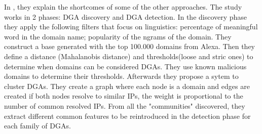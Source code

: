 In \cite{phoenix}, they explain the shortcomes of some of the other approaches. The study works in 2 phases: DGA discovery and DGA detection. In the discovery phase they apply the following filters that focus on linguistics: percentage of meaningful word in the domain name; popularity of the ngrams of the domain. They construct a base generated with the top 100.000 domains from Alexa. Then they define a distance (Mahalanobis distance) and thresholds(loose and stric ones) to determine when domains can be considered DGAs. They use known malicious domains to determine their thresholds. Afterwards they propose a sytem to cluster DGAs. They create a graph where each node is a domain and edges are created if both nodes resolve to similar IPs, the weight is proportional to the number of common resolved IPs. From all the "communities" discovered, they extract different common features to be reintroduced in the detection phase for each family of DGAs.
